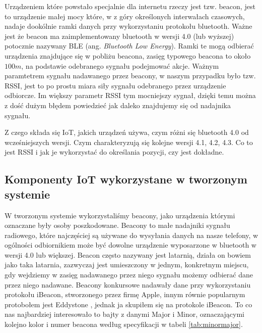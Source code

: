 Urządzeniem które powstało specjalnie dla internetu rzeczy jest tzw. beacon, jest to urządzenie małej mocy które, w z góry określonych interwałach czasowych, nadaje dookólnie ramki danych przy wykorzystaniu protokołu bluetooth. Ważne jest że beacon ma zaimplementowany bluetooth w wersji 4.0 (lub wyższej) potocznie nazywany BLE (ang. \textit{Bluetooth Low Energy}). Ramki te mogą odbierać urządzenia znajdujące się w pobliżu beacona, zasięg typowego beacona to około $100 m$, na podstawie odebranego sygnału podejmować akcje. Ważnym paramtetrem sygnału nadawanego przez beacony, w naszym przypadku było tzw. RSSI, jest to po prostu miara siły sygnału odebranego przez urządzenie odbiorcze. Im większy parametr RSSI tym mocniejszy sygnał, dzięki temu można z dość dużym błędem powiedzieć jak daleko znajdujemy się od nadajnika sygnału.

Z czego składa się IoT, jakich urządzeń używa, czym różni się bluetooth 4.0 od wcześniejszych wersji. Czym charakteryzują się kolejne wersji 4.1, 4.2, 4.3. Co to jest RSSI i jak je wykorzystać do określania pozycji, czy jest dokładne.

\subsection{Komponenty IoT wykorzystane w tworzonym systemie}

W tworzonym systemie wykorzystaliśmy beacony, jako urządzenia którymi oznaczane były osoby poszkodowane. Beacony to małe nadajniki sygnału radiowego, które najczęściej są używane do wysyłania danych na nasze telefony, w ogólności odbiornikiem może być dowolne urządzenie wyposarzone w bluetooth w wersji 4.0 lub większej. Beacon często nazywany jest latarnią, działa on bowiem jako taka latarnia, zazwyczaj jest umieszczony w jednym, konkretnym miejscu, gdy wejdziemy w zasięg nadawanego przez niego sygnału możemy odbierać dane przez niego nadawane. Beacony konkursowe nadawały dane przy wykorzystaniu protokołu iBeacon\cite{ibeacon}, stworzonego przez firmę Apple, innym równie popularnym protobołem jest Eddystone \cite{eddystone}, jednak ja skupiłem się na protokole iBeacon. To co nas najbardziej interesowało to bajty z danymi Major i Minor, oznaczającymi kolejno kolor i numer beacona według specyfikacji w tabeli \ref{tab:minormajor}.

